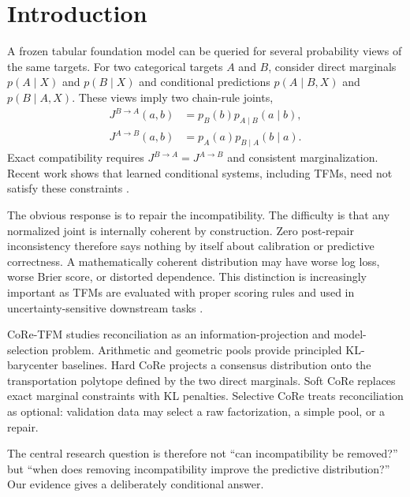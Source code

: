 \documentclass[twoside,11pt]{article}
\newcommand{\Jone}{J^{B\rightarrow A}}
\newcommand{\Jtwo}{J^{A\rightarrow B}}
\begin{document}
\section{Introduction}
A frozen tabular foundation model can be queried for several probability views of the same targets. For two categorical targets $A$ and $B$, consider direct marginals $p(A\mid X)$ and $p(B\mid X)$ and conditional predictions $p(A\mid B,X)$ and $p(B\mid A,X)$. These views imply two chain-rule joints,
\begin{align}
\Jone(a,b)&=p_B(b)p_{A\mid B}(a\mid b),\\
\Jtwo(a,b)&=p_A(a)p_{B\mid A}(b\mid a).
\end{align}
Exact compatibility requires $\Jone=\Jtwo$ and consistent marginalization. Recent work shows that learned conditional systems, including TFMs, need not satisfy these constraints \citep{klotergens2026agree,majid2025consistent}.

The obvious response is to repair the incompatibility. The difficulty is that any normalized joint is internally coherent by construction. Zero post-repair inconsistency therefore says nothing by itself about calibration or predictive correctness. A mathematically coherent distribution may have worse log loss, worse Brier score, or distorted dependence. This distinction is increasingly important as TFMs are evaluated with proper scoring rules and used in uncertainty-sensitive downstream tasks \citep{gneiting2007strictly,landsgesell2026scoringbench,johnson2026uq}.

CoRe-TFM studies reconciliation as an information-projection and model-selection problem. Arithmetic and geometric pools provide principled KL-barycenter baselines. Hard CoRe projects a consensus distribution onto the transportation polytope defined by the two direct marginals. Soft CoRe replaces exact marginal constraints with KL penalties. Selective CoRe treats reconciliation as optional: validation data may select a raw factorization, a simple pool, or a repair.

The central research question is therefore not ``can incompatibility be removed?'' but ``when does removing incompatibility improve the predictive distribution?'' Our evidence gives a deliberately conditional answer.
\end{document}
